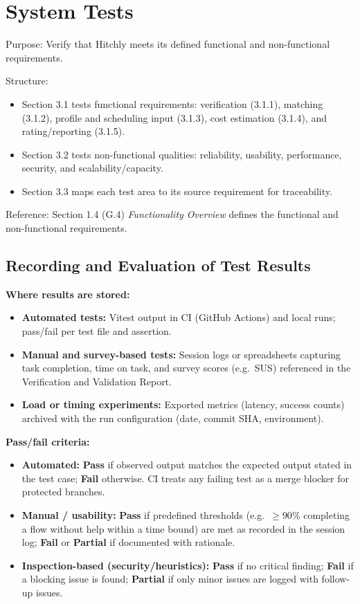 \documentclass[12pt, titlepage]{article}
\begin{document}
\section{System Tests}

Purpose: Verify that Hitchly meets its defined functional and non-functional requirements.

Structure: 
\begin{itemize}
    \item Section 3.1 tests functional requirements: verification (3.1.1), matching (3.1.2), profile and scheduling input (3.1.3), cost estimation (3.1.4), and rating/reporting (3.1.5).
    \item Section 3.2 tests non-functional qualities: reliability, usability, performance, security, and scalability/capacity.
    \item Section 3.3 maps each test area to its source requirement for traceability.
\end{itemize}

Reference: Section 1.4 (G.4) \textit{Functionality Overview} defines the functional and non-functional requirements.

\subsection*{Recording and Evaluation of Test Results}

\textbf{Where results are stored:}
\begin{itemize}
    \item \textbf{Automated tests:} Vitest output in CI (GitHub Actions) and local runs; pass/fail per test file and assertion.
    \item \textbf{Manual and survey-based tests:} Session logs or spreadsheets capturing task completion, time on task, and survey scores (e.g.\ SUS) referenced in the Verification and Validation Report.
    \item \textbf{Load or timing experiments:} Exported metrics (latency, success counts) archived with the run configuration (date, commit SHA, environment).
\end{itemize}

\textbf{Pass/fail criteria:}
\begin{itemize}
    \item \textbf{Automated:} \textbf{Pass} if observed output matches the expected output stated in the test case; \textbf{Fail} otherwise. CI treats any failing test as a merge blocker for protected branches.
    \item \textbf{Manual / usability:} \textbf{Pass} if predefined thresholds (e.g.\ $\geq 90\%$ completing a flow without help within a time bound) are met as recorded in the session log; \textbf{Fail} or \textbf{Partial} if documented with rationale.
    \item \textbf{Inspection-based (security/heuristics):} \textbf{Pass} if no critical finding; \textbf{Fail} if a blocking issue is found; \textbf{Partial} if only minor issues are logged with follow-up issues.
\end{itemize}
\end{document}
